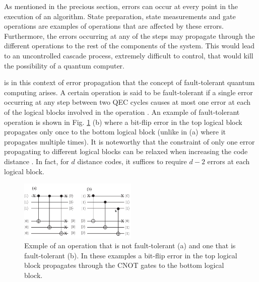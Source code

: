 
As mentioned in the precious section, errors can occur at every point in the
execution of an algorithm. State preparation, state measurements and gate
operations are examples of operations that are affected by these errors.
Furthermore, the errors occurring at any of the steps may propagate through the
different operations to the rest of the components of the system.
This would lead to an uncontrolled cascade process, extremely difficult to
control, that would kill the possibility of a quantum computer. %

is in this context of error propagation that the concept of fault-tolerant
quantum computing arises. A certain operation is said to be fault-tolerant if a
single error occurring at any step between two QEC cycles causes at most one
error at each of the logical blocks involved in the operation
\cite{Devitt_2013}. An example of fault-tolerant operation is shown in Fig.
\ref{fig:fault_tol} (b) where a bit-flip error in the top logical block
propagates only once to the bottom logical block (unlike in (a) where it
propagates multiple times). It is noteworthy that the constraint of only one
error propagating to different logical blocks can be relaxed when increasing the
code distance \cite{Devitt_2013}. In fact, for $d$ distance codes, it suffices to
require $d-2$ errors at each logical block.

\begin{figure}[htbp]
  \centering
  \includegraphics[width=0.5\textwidth]{images/fault_tolerance.png}
  \caption{Exmple of an operation that is not fault-tolerant (a) and one that is
    fault-tolerant (b). In these examples a bit-flip error in the top logical
    block propagates through the CNOT gates to the bottom logical block.}
  \label{fig:fault_tol}
\end{figure}


